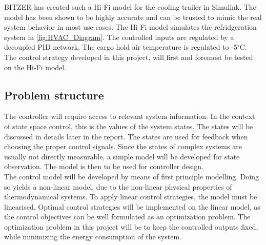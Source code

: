BITZER has created such a Hi-Fi model for the cooling trailer in Simulink. The model has been shown to be highly accurate and can be trusted to mimic the real system behavior in most use-cases. The Hi-Fi model simulates the refridgeration system in \cref{fig:HVAC_Diagram}. The controlled inputs are regulated by a decoupled PID network. The cargo hold air temperature is regulated to -5$^{\circ}$C.\\

The control strategy developed in this project, will first and foremost be tested on the Hi-Fi model. 




\subsection{Problem structure}

The controller will require access to relevant system information. In the context of state space control, this is the values of the system states. The states will be discussed in details later in the report. The states are used for feedback when choosing the proper control signals. Since the states of complex systems are usually not directly measurable, a simple model will be developed for state observation. The model is then to be used for controller design. \\

The control model will be developed by means of first principle modelling. Doing so yields a non-linear model, due to the non-linear physical properties of thermodynamical systems. To apply linear control strategies, the model must be linearised. Optimal control strategies will be implemented on the linear model, as the control objectives can be well formulated as an optimization problem. The optimization problem in this project will be to keep the controlled outputs fixed, while minimizing the energy consumption of the system.\\


		
